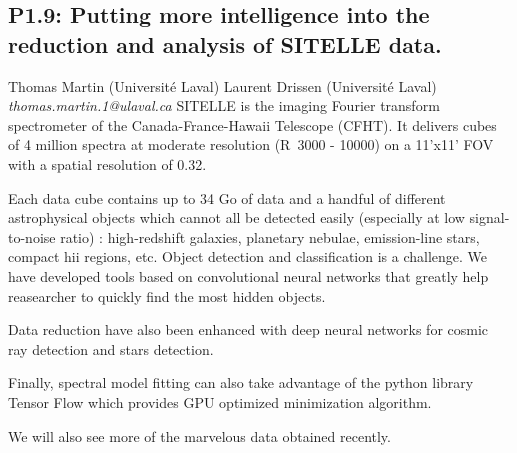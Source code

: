 \documentclass{report}
\begin{document}
\subsection*{P1.9: Putting more intelligence into the reduction and analysis of SITELLE data.}
\bigskip
Thomas Martin (Université Laval) \newline Laurent Drissen (Université Laval) \newline   \newline   \newline  \newline  \newline\newline
{\it thomas.martin.1@ulaval.ca}\newline
\newline\newline
SITELLE is the imaging Fourier transform spectrometer of the Canada-France-Hawaii Telescope (CFHT). It delivers cubes of 4 million spectra at moderate resolution (R~3000 - 10000) on a 11'x11' FOV with a spatial resolution of 0.32. 

Each data cube contains up to 34 Go of data and a handful of different astrophysical objects which cannot all be detected easily (especially at low signal-to-noise ratio) : high-redshift galaxies, planetary nebulae, emission-line stars, compact hii regions, etc. Object detection and classification is a challenge. We have developed tools based on convolutional neural networks that greatly help reasearcher to quickly find the most hidden objects.

Data reduction have also been enhanced with deep neural networks for cosmic ray detection and stars detection.

Finally, spectral model fitting can also take advantage of the python library Tensor Flow which provides GPU optimized minimization algorithm.

We will also see more of the marvelous data obtained recently.\newline
\newpage
\end{document}
